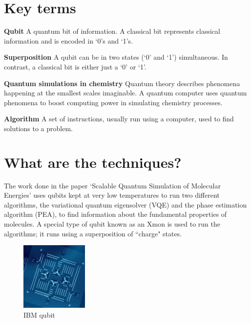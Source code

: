 \documentclass[14pt,landscape,color=UCLdarkred,margin=3cm]{uclposter}
\begin{document}
\begin{multicols}{3}
\section*{Key terms}
\begin{highlightbox}
	\textbf{Qubit} A quantum bit of information. A classical bit represents classical information and is encoded in `0's and `1's.
\end{highlightbox}

\begin{highlightbox}
  \textbf{Superposition} A qubit can be in two states (`0' and `1') simultaneous. In contrast, a classical bit is either just a `0' or `1'.
\end{highlightbox}



\begin{highlightbox}
\textbf{Quantum simulations in chemistry} Quantum theory describes phenomena happening at the smallest scales imaginable. A quantum computer uses quantum phenomena to boost computing power in simulating chemistry processes.

\end{highlightbox}

\begin{highlightbox}
\textbf{Algorithm} A set of instructions, usually run using a computer, used to find solutions to a problem. 
\end{highlightbox}

\columnbreak

\section*{What are the techniques?}


The work done in the paper `Scalable Quantum Simulation of Molecular Energies' uses qubits kept at very low temperatures to run two different algorithms, the variational quantum eigensolver (VQE) and the phase estimation algorithm (PEA),  to find information about the fundamental properties of molecules. A special type of qubit known as an Xmon is used to run the algorithms; it runs using a superposition of ``charge" states.
\\
\begin{figure}[H]
  \begin{center}
\setlength{\fboxsep}{0.5em}
  \begin{minipage}[c]{9em}
  \begin{center}
  \includegraphics[width=9em]{4_Qubit.png}
    \caption{IBM qubit}
  \end{center}
    

\end{minipage}
\end{center}
\end{figure}
\end{multicols}
\end{document}
